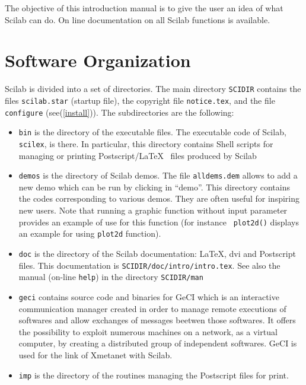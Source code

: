 	The objective of this introduction manual is to give the user 
an idea of what Scilab can do. On line documentation on all
Scilab functions is available.




\section{Software Organization}

Scilab is divided into a set of directories. The main directory
\verb!SCIDIR! contains the files {\tt scilab.star} (startup file), the
copyright file {\tt notice.tex}, and the file \verb!configure! 
(see(\ref{install})).
The subdirectories are the following:
\begin{itemize}

\item{{\tt bin} is the directory of the executable files.
The executable code of Scilab, {\tt scilex}, is there. In
particular, this directory contains Shell scripts 
for managing or printing Postscript/\LaTeX~ files produced by Scilab }

\item{{\tt demos} is the directory of Scilab demos. The file 
{\tt alldems.dem} allows to add a new demo which can be run by 
clicking in ``demo''. This directory contains the codes corresponding
to various demos. They are often useful for inspiring new users.
Note that running a graphic function without input parameter
provides an example of use for this function (for instance {\tt
plot2d()} displays an example for using {\tt plot2d}  function). }

\item{{\tt doc} is the directory of the Scilab documentation: \LaTeX, dvi 
and Postscript files. 
This documentation is {\tt SCIDIR/doc/intro/intro.tex}. See 
also the manual (on-line {\tt help}) in the directory {\tt SCIDIR/man}}

\item{{\tt geci} contains source code and binaries for GeCI which is an 
interactive communication manager created in order to
manage remote executions of softwares and allow exchanges of messages
beetwen those softwares. It offers the possibility to exploit numerous
machines on a network, as a virtual computer, by creating a
distributed group of independent softwares. GeCI is used for the link
of Xmetanet with Scilab.}


\item{{\tt imp} is the directory of the routines managing the Postscript files
for print.}


\end{itemize}
